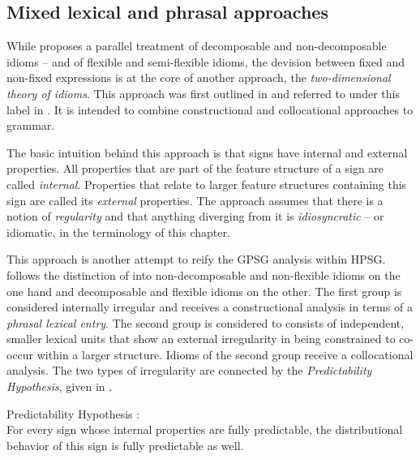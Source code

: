 \documentclass[output=paper]{langsci/langscibook}
\begin{document}

\subsection{Mixed lexical and phrasal approaches}
\label{Sec-Mixed}

While \cite{Riehemann2001a} proposes a parallel treatment of decomposable and non-decomposable idioms -- and of flexible and semi-flexible idioms, the devision between fixed and non-fixed expressions is at the core of another approach, the \emph{two-dimensional theory of idioms}. This approach was first outlined in \cite{Sailer2000a} and referred to under this label in \cite{Richter:Sailer:09,Richter:Sailer:14}. It is intended to combine constructional and collocational approaches to grammar.

The basic intuition behind this approach is that signs have internal and external properties. 
All properties that are part of the feature structure of a sign are called \emph{internal}. 
Properties that relate to larger feature structures containing this sign are called its \emph{external} properties. 
The approach assumes that there is a notion of \emph{regularity} and that anything diverging from it is \emph{idiosyncratic} -- or idiomatic, in the terminology of this chapter. 

This approach is another attempt to reify the GPSG analysis within HPSG.
\cite{Sailer2000a} follows the distinction of \cite{NSW94a} into non-decomposable and non-flexible idioms on the one hand and decomposable and flexible idioms on the other. The first group is considered internally irregular and receives a constructional analysis in terms of a \emph{phrasal lexical entry}. The second group is considered to consists of independent, smaller lexical units that show an external irregularity in being constrained to co-occur within a larger structure. 
Idioms of the second group receive a collocational analysis. The two types of irregularity are connected by the  \emph{Predictability Hypothesis}, given in .

\ea Predictability Hypothesis \citep[]{Sailer2000a}:\label{PredHypo}\\
For every sign whose internal properties are fully predictable, the distributional
behavior of this sign is fully predictable as well.
\z 
\end{document}
